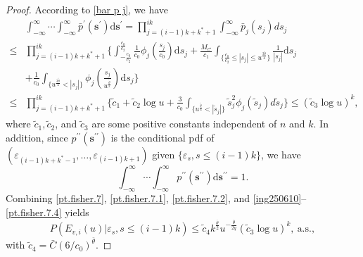 \documentclass[ejsv2]{imsart}
\theoremstyle{plain}
\theoremstyle{definition}
\theoremstyle{remark}
\begin{document}
\begin{proof}
According to \eqref{bar p j}, we have
\begin{equation}\label{pt.fisher.7.3}
\begin{split}
     & \int_{-\infty}^{\infty}\cdots\int_{-\infty}^{\infty}
 \bar{p}^{\prime}(\mathbf{s}^\prime)\mathrm{d}\mathbf{s}^{\prime}=
 \prod_{j=(i-1)k+k^\ast+1}^{ik}
\int_{-\infty}^{\infty}\bar{p}_{j}(s_j)ds_{j}
 \\
    \leq & \prod_{j=(i-1)k+k^\ast+1}^{ik}\bigg\{\int_{-\frac{c_0}{c_2}}^{\frac{c_0}{c_2}} \frac{1}{c_0}
   \phi_j(\frac{s_j}{c_0})\mathrm{d}s_j+\frac{M_{c^\star}}{c_1}\int_{\{\frac{c_0}{c_2}\leq |s_j|\leq u^{\frac{3{\tilde{\theta}}}{4}}\}}\frac{1}{|s_j|} \mathrm{d}s_j\\
   &+\frac{1}{c_0}\int_{\{u^{\frac{3{\tilde{\theta}}}{4}}<|s_j|\}} \phi_j(\frac{s_j}{u^{\frac{{\tilde{\theta}}}{2}}})\mathrm{d}s_j \bigg\}\\
   \leq & \prod_{j=(i-1)k+k^\ast+1}^{ik}\bigg\{\tilde{c}_1+\tilde{c}_2\log u+\frac{3}{c_0}\int_{\{u^{\frac{{\tilde{\theta}}}{4}}<|\tilde{s}_j|\}} \tilde{s}_j^2 \phi_j(\tilde{s}_j)d\tilde{s}_j\bigg\} \leq (\tilde{c}_3\log u)^{k},
\end{split}
\end{equation}
where $\tilde{c}_1,\tilde{c}_2$, and $\tilde{c}_3$
are some positive constants independent of $n$ and $k$. In addition, since  $p^{\prime\prime}(\mathbf{s}^{\prime\prime})$ is the conditional pdf of $(\varepsilon_{(i-1)k+k^{*}-1}, \ldots, \varepsilon_{(i-1)k+1})$
given $\{\varepsilon_s, s\leq (i-1)k\}$, we have
\begin{equation}\label{pt.fisher.7.4}
{\int_{-\infty}^{\infty}\cdots\int_{-\infty}^{\infty}
p^{\prime\prime}(\mathbf{s}^{\prime\prime}) \mathrm{d}\mathbf{s}^{\prime\prime}}=1.
\end{equation}
Combining \eqref{pt.fisher.7}, \eqref{pt.fisher.7.1}, \eqref{pt.fisher.7.2}, and \eqref{ing250610}--\eqref{pt.fisher.7.4} yields 
\begin{equation}
\label{pt.fisher.7.5}
P(E_{v,i}(u)|\varepsilon_s,s\leq (i-1)k)\leq \tilde{c}_4{k^{\frac{\bar{\theta}}{2}}}u^{-\frac{\bar{\theta}}{2q}}({\tilde{c}_3}\log u)^k,\ \textrm{a.s.},
\end{equation}
with $\tilde{c}_4=\bar{C}(6/c_{0})^{\bar{\theta}}$. 


\end{proof}
\end{document}
